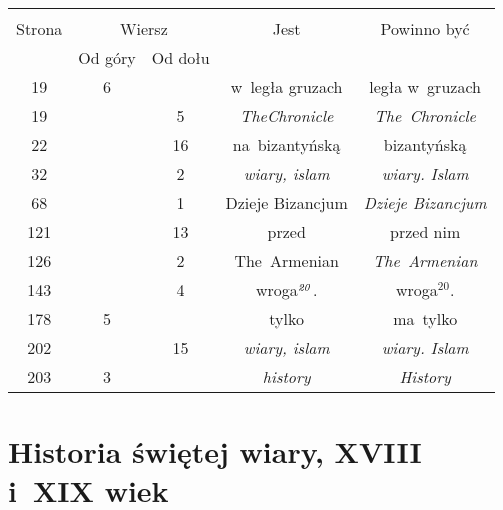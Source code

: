 \documentclass[a4paper,11pt]{article}
\begin{document}







\begin{center}

  \begin{tabular}{|c|c|c|c|c|}
    \hline
    & \multicolumn{2}{c|}{} & & \\
    Strona & \multicolumn{2}{c|}{Wiersz} & Jest
                              & Powinno być \\ \cline{2-3}
    & Od góry & Od dołu & & \\
    \hline
    19  &  6 & & w~legła gruzach & legła w~gruzach \\
    19  & &  5 & \textit{TheChronicle} & \textit{The~Chronicle} \\
    22  & & 16 & na~bizantyńską & bizantyńską \\
    32  & &  2 & \textit{wiary, islam} & \textit{wiary. Islam} \\
    68  & &  1 & Dzieje Bizancjum & \textit{Dzieje Bizancjum} \\
    121 & & 13 & przed & przed nim \\
    126 & &  2 & The~Armenian & \textit{The~Armenian} \\
    143 & &  4 & wroga$^{ \textrm{\textit{20}} }$. & wroga$^{ 20 }$. \\
    178 &  5 & & tylko & ma~tylko \\
    202 & & 15 & \textit{wiary, islam} & \textit{wiary. Islam} \\
    203 &  3 & & \textit{history} & \textit{History} \\
    \hline
  \end{tabular}

\end{center}

\vspace{\spaceTwo}










\section{Historia świętej wiary, XVIII i~XIX wiek}
\end{document}
